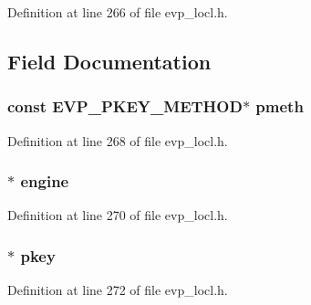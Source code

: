 Definition at line 266 of file evp\+\_\+locl.\+h.



\subsection{Field Documentation}
\subsubsection[{\texorpdfstring{pmeth}{pmeth}}]{\setlength{\rightskip}{0pt plus 5cm}const {\bf E\+V\+P\+\_\+\+P\+K\+E\+Y\+\_\+\+M\+E\+T\+H\+OD}$\ast$ pmeth}\hypertarget{structevp__pkey__ctx__st_a7e3facfcb3c425db04de11f7c3551069}{}\label{structevp__pkey__ctx__st_a7e3facfcb3c425db04de11f7c3551069}


Definition at line 268 of file evp\+\_\+locl.\+h.

\subsubsection[{\texorpdfstring{engine}{engine}}]{$\ast$ engine}\hypertarget{structevp__pkey__ctx__st_a4eb35fa252ec72ad7c53a4c8d30a7fd3}{}\label{structevp__pkey__ctx__st_a4eb35fa252ec72ad7c53a4c8d30a7fd3}


Definition at line 270 of file evp\+\_\+locl.\+h.

\subsubsection[{\texorpdfstring{pkey}{pkey}}]{$\ast$ pkey}\hypertarget{structevp__pkey__ctx__st_a76a3c5d8ec8f468075eb3e366a35a83c}{}\label{structevp__pkey__ctx__st_a76a3c5d8ec8f468075eb3e366a35a83c}


Definition at line 272 of file evp\+\_\+locl.\+h.

